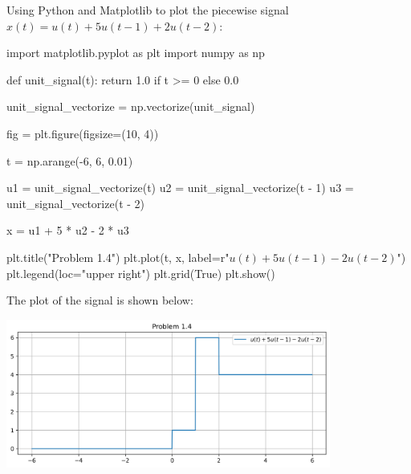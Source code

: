 \documentclass[a4paper, 10pt]{article}
\begin{document}
\begin{solution}
Using Python and Matplotlib to plot the piecewise signal \( x(t) = u(t) + 5u(t - 1) + 2u(t - 2) \):
\begin{codingbox}
import matplotlib.pyplot as plt
import numpy as np

def unit_signal(t):
    return 1.0 if t >= 0 else 0.0

unit_signal_vectorize = np.vectorize(unit_signal)

fig = plt.figure(figsize=(10, 4))

t = np.arange(-6, 6, 0.01)

u1 = unit_signal_vectorize(t)
u2 = unit_signal_vectorize(t - 1)
u3 = unit_signal_vectorize(t - 2)

x = u1 + 5 * u2 - 2 * u3

plt.title("Problem 1.4")
plt.plot(t, x, label=r"$u(t) + 5u(t-1) - 2u(t-2)$")
plt.legend(loc="upper right")
plt.grid(True)
plt.show()
\end{codingbox}

The plot of the signal is shown below:
\begin{center}
    \includegraphics[width=0.8\textwidth]{images/problem_1_4.png}
\end{center}
\end{solution}

\newpage
\end{document}
